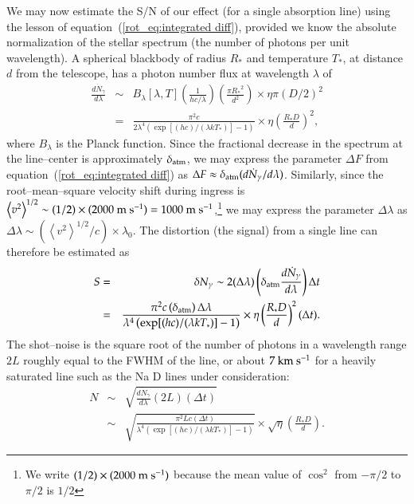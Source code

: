 We may now estimate the S/N of our effect (for a single absorption
line) using the lesson of equation~(\ref{rot_eq:integrated diff}),
provided we know the absolute normalization of the stellar spectrum
(the number of photons per unit wavelength).  A spherical blackbody of
radius $R_*$ and temperature $T_*$, at distance $d$ from the
telescope, has a photon number flux at wavelength $\lambda$ of
\begin{eqnarray}
\nonumber \frac{d \dot{N}_\gamma}{d \lambda} & \sim & B_\lambda[\lambda,T] \left( \frac{1}{h c/\lambda} \right) \left( \frac{\pi {R_*}^2}{d^2} \right) \times \eta \pi (D/2)^2\\
\label{rot_eq:spectrum} & = & \frac{\pi^2 c}{2 \lambda^4 \left( \exp[(h c)/(\lambda k T_*)] -1 \right)} \times \eta \left(\frac{{R_* D}}{d}\right)^2,
\end{eqnarray}
where $B_\lambda$ is the Planck function.  Since the fractional
decrease in the spectrum at the line--center is approximately
$\delta_{\rm atm}$, we may express the parameter $\Delta F$ from
equation~(\ref{rot_eq:integrated diff}) as $\Delta F \approx
\delta_{\rm atm} (d \dot{N}_\gamma / d \lambda)$.  Similarly, since
the root--mean--square velocity shift during ingress is $\left< v^2
\right>^{1/2} \sim (1/2) \times( 2000 {\rm~m~s^{-1}}) = 1000 {\rm
~m~s^{-1}}$,\footnote{We write $(1/2) \times (2000 {\rm~m~s^{-1}})$
because the mean value of $\cos^2$ from $-\pi/2$ to $\pi/2$ is $1/2$}
we may express the parameter $\Delta \lambda$ as $\Delta \lambda \sim
(\left< v^2 \right>^{1/2} / c) \times \lambda_0$.  The distortion (the
signal) from a single line can therefore be estimated as
\begin{eqnarray}
\nonumber S & = & \delta N_\gamma \sim 2 (\Delta \lambda) \left( \delta_{\rm atm} \frac{d \dot{N}_\gamma}{d \lambda}\right) \Delta t\\
\label{rot_eq:signal estimate} & = & \frac{\pi^2 c \left(\delta_{\rm atm}\right) \Delta \lambda}{\lambda^4 \left( \exp[(h c)/(\lambda k T_*)] -1 \right)} \times \eta \left(\frac{{R_* D}}{d}\right)^2 (\Delta t).
\end{eqnarray}
The shot--noise is the square root of the number of photons in a
wavelength range $2L$ roughly equal to the FWHM of the line, or about
$7 {\rm ~km~s^{-1}}$ for a heavily saturated line such as the Na D
lines under consideration:
\begin{eqnarray}
\nonumber N & \sim & \sqrt{\frac{d \dot{N}_\gamma}{d\lambda} (2L) (\Delta t)} \\
\label{rot_eq:noise estimate} & \sim & \sqrt{\frac{\pi^2 L c (\Delta t)}{\lambda^4 \left( \exp[(h c)/(\lambda k T_*)] -1 \right)}} \times \sqrt{\eta} \left( \frac{R_* D}{d} \right).
\end{eqnarray}
